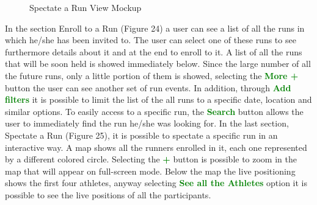 \begin{enumerate}
\begin{figure}[H]
\begin{center}
\begin{minipage}[c]{.40\textwidth}
	\caption{Spectate a Run View Mockup}
        \end{minipage}
      \end{center}
\end{figure}
In the section Enroll to a Run (Figure 24) a user can see a list of all the runs in which he/she has been invited to. The user can select one of these runs to see furthermore details about it and at the end to enroll to it. A list of all the runs that will be soon held is showed immediately below. Since the large number of all the future runs, only a little portion of them is showed, selecting the {\textcolor{Green}{\textbf{More +}}} button the user can see another set of run events. In addition, through {\textcolor{Green}{\textbf{Add filters}}} it is possible to limit the list of the all runs to a specific date, location and similar options. To easily access to a specific run, the {\textcolor{Green}{\textbf{Search}}} button allows the user to immediately find the run he/she was looking for. In the last section, Spectate a Run (Figure 25), it is possible to spectate a specific run in an interactive way. A map shows all the runners enrolled in it, each one represented by a different colored circle. Selecting the {\textcolor{Green}{\textbf{+}}} button is possible to zoom in the map that will appear on full-screen mode. Below the map the live positioning shows the first four athletes, anyway selecting {\textcolor{Green}{\textbf{See all the Athletes}}} option it is possible to see the live positions of all the participants.
\clearpage
\end{enumerate}